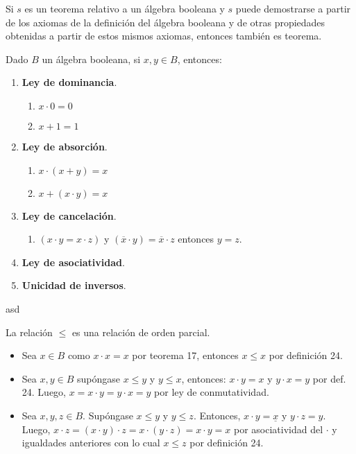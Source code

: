 \begin{teorema}
    Si $s$ es un teorema relativo a un álgebra booleana y $s$ puede demostrarse a partir de los axiomas de la definición del álgebra booleana y de otras propiedades obtenidas a partir de estos mismos axiomas, entonces también es teorema.
\end{teorema}

\begin{teorema}
    Dado $B$ un álgebra booleana, si $x,y\in B$, entonces: 
    \begin{enumerate}
        \item \textbf{Ley de dominancia}.
        \begin{enumerate}
            \item $x\cdot 0 = 0$
            \item $x+1 =1$
        \end{enumerate}
        \item \textbf{Ley de absorción}. 
        \begin{enumerate}
            \item $x\cdot (x+y)=x$
            \item $x+(x\cdot y)=x$
        \end{enumerate}
        \item \textbf{Ley de cancelación}. 
        \begin{enumerate}
            \item $(x\cdot y = x\cdot z)$ y $(\overline{x}\cdot y) =  \overline{x}\cdot z$ entonces $y=z$.
        \end{enumerate} 
        \item \textbf{Ley de asociatividad}.
        \item  \textbf{Unicidad de inversos}.
    \end{enumerate}
\end{teorema}

\begin{definicion}[24]
    asd
\end{definicion}

\begin{teorema}
    La relación $\leq$ es una relación de orden parcial. 
    \begin{dem}
        \begin{itemize}
            \item Sea $x\in B$ como $x\cdot x=x$ por teorema 17, entonces $x\leq x$ por definición 24. 
            \item Sea $x,y\in B$ supóngase $x\leq y$ y $y\leq x$, entonces: $x\cdot y =x$ y $y\cdot x =y$ por def. 24. Luego, $x=x\cdot  y = y\cdot x = y$ por ley de conmutatividad. 
            \item Sea $x,y,z\in B$. Supóngase $x\leq y$ y $y\leq z$. Entonces, $x\cdot y=\underline{x}$ y $y\cdot z = y$. Luego, $x\cdot z = (x\cdot y)\cdot z = x\cdot (y\cdot z) = x\cdot y = x$ por asociatividad del $\cdot$ y  igualdades anteriores con lo cual $x\leq z$ por definición 24. 
        \end{itemize}
    \end{dem}
\end{teorema}